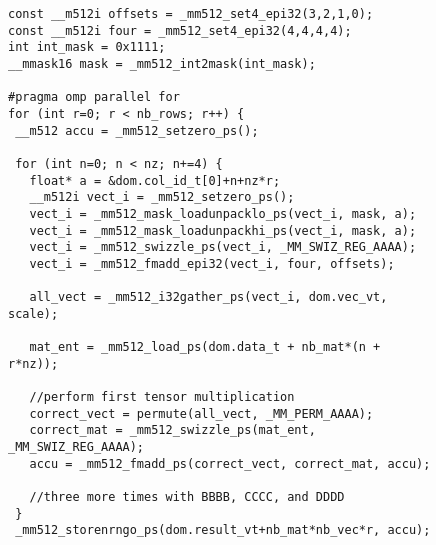\documentclass{article}
\begin{document}
\thispagestyle{empty}

\begin{figure}[h]
\begin{center}
\begin{verbatim}
const __m512i offsets = _mm512_set4_epi32(3,2,1,0);
const __m512i four = _mm512_set4_epi32(4,4,4,4); 
int int_mask = 0x1111;
__mmask16 mask = _mm512_int2mask(int_mask);

#pragma omp parallel for
for (int r=0; r < nb_rows; r++) {
 __m512 accu = _mm512_setzero_ps();

 for (int n=0; n < nz; n+=4) {
   float* a = &dom.col_id_t[0]+n+nz*r;
   __m512i vect_i = _mm512_setzero_ps();
   vect_i = _mm512_mask_loadunpacklo_ps(vect_i, mask, a);
   vect_i = _mm512_mask_loadunpackhi_ps(vect_i, mask, a);
   vect_i = _mm512_swizzle_ps(vect_i, _MM_SWIZ_REG_AAAA);
   vect_i = _mm512_fmadd_epi32(vect_i, four, offsets);

   all_vect = _mm512_i32gather_ps(vect_i, dom.vec_vt, scale);

   mat_ent = _mm512_load_ps(dom.data_t + nb_mat*(n + r*nz));

   //perform first tensor multiplication
   correct_vect = permute(all_vect, _MM_PERM_AAAA);
   correct_mat = _mm512_swizzle_ps(mat_ent, _MM_SWIZ_REG_AAAA);
   accu = _mm512_fmadd_ps(correct_vect, correct_mat, accu);

   //three more times with BBBB, CCCC, and DDDD
 }
 _mm512_storenrngo_ps(dom.result_vt+nb_mat*nb_vec*r, accu);  
\end{verbatim}
\end{center}
\end{figure}
\end{document}
